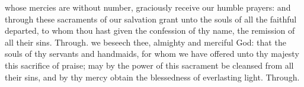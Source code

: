 \secret
{} whose mercies are without number, graciously receive our humble prayers: and through these sacraments of our salvation grant unto the souls of all the faithful departed, to whom thou hast given the confession of thy name, the remission of all their sins. Through.
\postcommunion
{} we beseech thee, almighty and merciful God: that the souls of thy servants and handmaids, for whom we have offered unto thy majesty this sacrifice of praise; may by the power of this sacrament be cleansed from all their sins, and by thy mercy obtain the blessedness of everlasting light. Through.

